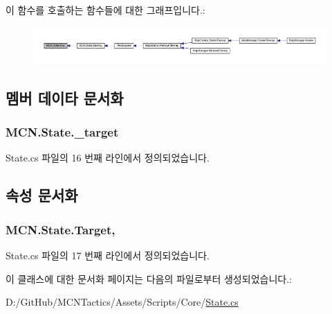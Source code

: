 이 함수를 호출하는 함수들에 대한 그래프입니다.\+:\nopagebreak
\begin{figure}[H]
\begin{center}
\leavevmode
\includegraphics[width=350pt]{class_m_c_n_1_1_state_afdec72a816a8a8ec584cac758a027215_icgraph}
\end{center}
\end{figure}




\subsection{멤버 데이타 문서화}
\subsubsection[{\texorpdfstring{\+\_\+target}{_target}}]{ M\+C\+N.\+State.\+\_\+target\hspace{0.3cm}{\ttfamily [private]}}\hypertarget{class_m_c_n_1_1_state_a13fe398868da354cfde9ff644e12e9f2}{}\label{class_m_c_n_1_1_state_a13fe398868da354cfde9ff644e12e9f2}


State.\+cs 파일의 16 번째 라인에서 정의되었습니다.



\subsection{속성 문서화}
\subsubsection[{\texorpdfstring{Target}{Target}}]{ M\+C\+N.\+State.\+Target\hspace{0.3cm}{\ttfamily [get]}, {\ttfamily [protected]}}\hypertarget{class_m_c_n_1_1_state_a79a563b32f183c9adc9a96679fc57eb8}{}\label{class_m_c_n_1_1_state_a79a563b32f183c9adc9a96679fc57eb8}


State.\+cs 파일의 17 번째 라인에서 정의되었습니다.



이 클래스에 대한 문서화 페이지는 다음의 파일로부터 생성되었습니다.\+:\begin{DoxyCompactItemize}
\item 
D\+:/\+Git\+Hub/\+M\+C\+N\+Tactics/\+Assets/\+Scripts/\+Core/\hyperlink{_state_8cs}{State.\+cs}\end{DoxyCompactItemize}
